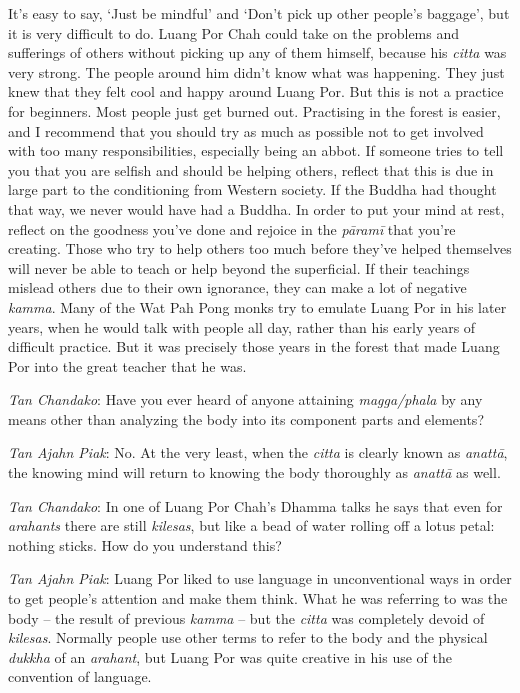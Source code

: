 It's easy to say, `Just be mindful' and `Don't pick up other people's
baggage', but it is very difficult to do. Luang Por Chah could take on
the problems and sufferings of others without picking up any of them
himself, because his \emph{citta} was very strong. The people around him
didn't know what was happening. They just knew that they felt cool and
happy around Luang Por. But this is not a practice for beginners. Most
people just get burned out. Practising in the forest is easier, and I
recommend that you should try as much as possible not to get involved
with too many responsibilities, especially being an abbot. If someone
tries to tell you that you are selfish and should be helping others,
reflect that this is due in large part to the conditioning from Western
society. If the Buddha had thought that way, we never would have had a
Buddha. In order to put your mind at rest, reflect on the goodness
you've done and rejoice in the \emph{pāramī} that you're creating. Those
who try to help others too much before they've helped themselves will
never be able to teach or help beyond the superficial. If their
teachings mislead others due to their own ignorance, they can make a lot
of negative \emph{kamma}. Many of the Wat Pah Pong monks try to emulate
Luang Por in his later years, when he would talk with people all day,
rather than his early years of difficult practice. But it was precisely
those years in the forest that made Luang Por into the great teacher
that he was.

\emph{Tan Chandako}: Have you ever heard of anyone attaining
\emph{magga/phala} by any means other than analyzing the body into its
component parts and elements?

\emph{Tan Ajahn Piak}: No. At the very least, when the \emph{citta} is
clearly known as \emph{anattā}, the knowing mind will return to knowing
the body thoroughly as \emph{anattā} as well.

\emph{Tan Chandako}: In one of Luang Por Chah's Dhamma talks he says
that even for \emph{arahants} there are still \emph{kilesas}, but like a
bead of water rolling off a lotus petal: nothing sticks. How do you
understand this?

\emph{Tan Ajahn Piak}: Luang Por liked to use language in unconventional
ways in order to get people's attention and make them think. What he was
referring to was the body -- the result of previous \emph{kamma} --
but the \emph{citta} was completely devoid of \emph{kilesas}. Normally
people use other terms to refer to the body and the physical
\emph{dukkha} of an \emph{arahant}, but Luang Por was quite creative in
his use of the convention of language.

